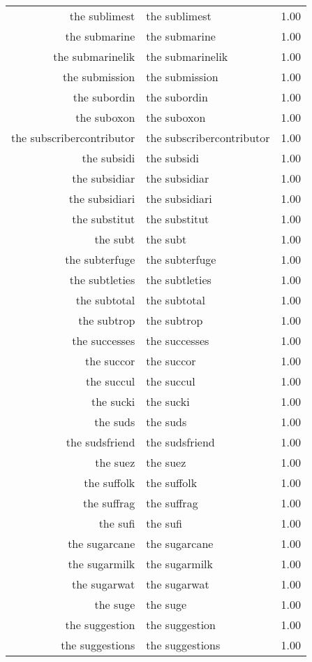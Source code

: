 \begin{table}[ht]
\begin{tabular}{rlr}
  the sublimest & the sublimest & 1.00 \\ 
  the submarine & the submarine & 1.00 \\ 
  the submarinelik & the submarinelik & 1.00 \\ 
  the submission & the submission & 1.00 \\ 
  the subordin & the subordin & 1.00 \\ 
  the suboxon & the suboxon & 1.00 \\ 
  the subscribercontributor & the subscribercontributor & 1.00 \\ 
  the subsidi & the subsidi & 1.00 \\ 
  the subsidiar & the subsidiar & 1.00 \\ 
  the subsidiari & the subsidiari & 1.00 \\ 
  the substitut & the substitut & 1.00 \\ 
  the subt & the subt & 1.00 \\ 
  the subterfuge & the subterfuge & 1.00 \\ 
  the subtleties & the subtleties & 1.00 \\ 
  the subtotal & the subtotal & 1.00 \\ 
  the subtrop & the subtrop & 1.00 \\ 
  the successes & the successes & 1.00 \\ 
  the succor & the succor & 1.00 \\ 
  the succul & the succul & 1.00 \\ 
  the sucki & the sucki & 1.00 \\ 
  the suds & the suds & 1.00 \\ 
  the sudsfriend & the sudsfriend & 1.00 \\ 
  the suez & the suez & 1.00 \\ 
  the suffolk & the suffolk & 1.00 \\ 
  the suffrag & the suffrag & 1.00 \\ 
  the sufi & the sufi & 1.00 \\ 
  the sugarcane & the sugarcane & 1.00 \\ 
  the sugarmilk & the sugarmilk & 1.00 \\ 
  the sugarwat & the sugarwat & 1.00 \\ 
  the suge & the suge & 1.00 \\ 
  the suggestion & the suggestion & 1.00 \\ 
  the suggestions & the suggestions & 1.00 \\ 

\end{tabular}
\end{table}
